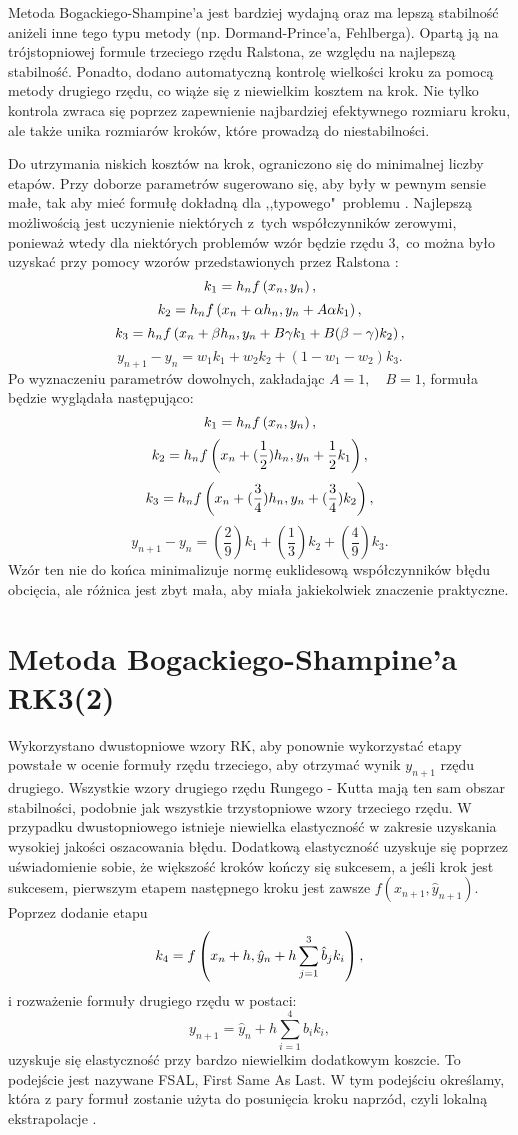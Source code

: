 Metoda Bogackiego-Shampine’a jest bardziej wydajną oraz ma lepszą stabilność aniżeli inne tego typu metody (np. Dormand-Prince’a, Fehlberga). Opartą ją na trójstopniowej formule trzeciego rzędu Ralstona, ze względu na najlepszą stabilność. Ponadto, dodano automatyczną kontrolę wielkości kroku za pomocą metody drugiego rzędu, co wiąże się z niewielkim kosztem na krok. Nie tylko kontrola zwraca się poprzez zapewnienie najbardziej efektywnego rozmiaru kroku, ale także unika rozmiarów kroków, które prowadzą do niestabilności.

Do utrzymania niskich kosztów na krok, ograniczono się do minimalnej liczby etapów. Przy doborze parametrów sugerowano się, aby były w pewnym sensie małe, tak aby mieć formułę dokładną dla ,,typowego"~problemu \cite{bogacki19893}. Najlepszą możliwością jest uczynienie niektórych z~tych współczynników zerowymi, ponieważ wtedy dla niektórych problemów wzór będzie rzędu 3,~co można było uzyskać przy pomocy wzorów przedstawionych przez Ralstona \cite{ralston1962runge}:
$$k_{1}=h_{n}f\left({x_{n},y_{n}}\right),$$
$$k_{2}=h_{n}f\left({x_{n}+\alpha h_{n},y_{n}+ A \alpha k_1}\right),$$
$$k_{3}=h_{n}f\left({x_{n}+\beta h_{n},y_{n}+ B \gamma  k_{1} + B (\beta - \gamma) k_{2}}\right),$$
\begin{equation}\label{eq:RK3}
y_{n+1}-y_{n}=w_{1} k_{1}+w_{2} k_{2}+(1 - w_{1} -w_{2}) k_{3}.
\end{equation}
Po wyznaczeniu parametrów dowolnych, zakładając $A=1, \quad B=1$, formuła będzie wyglądała następująco:
$$k_{1}=h_{n}f\left({x_{n},y_{n}}\right),$$
$$k_{2}=h_{n}f\left({x_{n}+(\frac{1}{2})h_{n},y_{n}+\frac{1}{2}k_1}\right),$$
$$k_{3}=h_{n}f\left({x_{n}+(\frac{3}{4})h_{n},y_{n}+(\frac{3}{4})k_{2}}\right),$$
$$y_{n+1}-y_{n}=(\frac{2}{9})k_{1}+(\frac{1}{3})k_{2}+(\frac{4}{9})k_{3}.$$
Wzór ten nie do końca minimalizuje normę euklidesową współczynników błędu obcięcia, ale różnica jest zbyt mała, aby miała jakiekolwiek znaczenie praktyczne.

\section{Metoda Bogackiego-Shampine'a RK3(2)}\label{s:A}
\indent Wykorzystano dwustopniowe wzory RK, aby ponownie wykorzystać etapy powstałe w ocenie formuły rzędu trzeciego, aby otrzymać wynik $y_{n+1}$ rzędu drugiego. Wszystkie wzory drugiego rzędu Rungego - Kutta mają ten sam obszar stabilności, podobnie jak wszystkie trzystopniowe wzory trzeciego rzędu. W przypadku dwustopniowego istnieje niewielka elastyczność w zakresie uzyskania wysokiej jakości oszacowania błędu. Dodatkową elastyczność uzyskuje się poprzez uświadomienie sobie, że większość kroków kończy się sukcesem, a jeśli krok jest sukcesem, pierwszym etapem następnego kroku jest zawsze $f(x_{n+1},\hat{y}_{n+1})$. Poprzez dodanie etapu 
$$k_{4}=f\left({x_{n}+h,\hat{y}_{n}+h\sum_{j=1}^{3}\hat{b}_{j}k_{i}}\right),$$
i rozważenie formuły drugiego rzędu w postaci:
$$y_{n+1}=\hat{y}_{n}+h\sum_{i=1}^{4}b_{i}k_{i},$$
uzyskuje się elastyczność przy bardzo niewielkim dodatkowym koszcie. To podejście jest nazywane FSAL, First Same As Last. W tym podejściu określamy, która z pary formuł zostanie użyta do posunięcia kroku naprzód, czyli lokalną ekstrapolacje \cite{bogacki19893}. 

